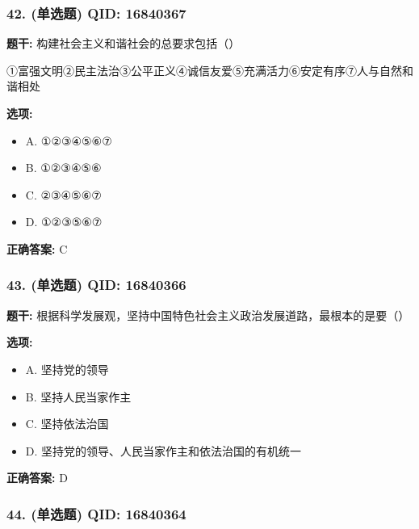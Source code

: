 \documentclass[12pt,UTF8]{ctexart}
\begin{document}
\subsubsection*{42. (单选题) \small QID: 16840367}

\textbf{题干:}
构建社会主义和谐社会的总要求包括（）
\par
①富强文明②民主法治③公平正义④诚信友爱⑤充满活力⑥安定有序⑦人与自然和谐相处

\textbf{选项:}
\begin{itemize}[leftmargin=*]

  \item A. ①②③④⑤⑥⑦

  \item B. ①②③④⑤⑥

  \item C. ②③④⑤⑥⑦

  \item D. ①②③⑤⑥⑦

\end{itemize}

\textbf{正确答案:}
C

\vspace{0.3em}\hrulefill\vspace{0.7em}

\subsubsection*{43. (单选题) \small QID: 16840366}

\textbf{题干:}
根据科学发展观，坚持中国特色社会主义政治发展道路，最根本的是要（）

\textbf{选项:}
\begin{itemize}[leftmargin=*]

  \item A. 坚持党的领导

  \item B. 坚持人民当家作主

  \item C. 坚持依法治国

  \item D. 坚持党的领导、人民当家作主和依法治国的有机统一

\end{itemize}

\textbf{正确答案:}
D

\vspace{0.3em}\hrulefill\vspace{0.7em}

\subsubsection*{44. (单选题) \small QID: 16840364}
\end{document}
